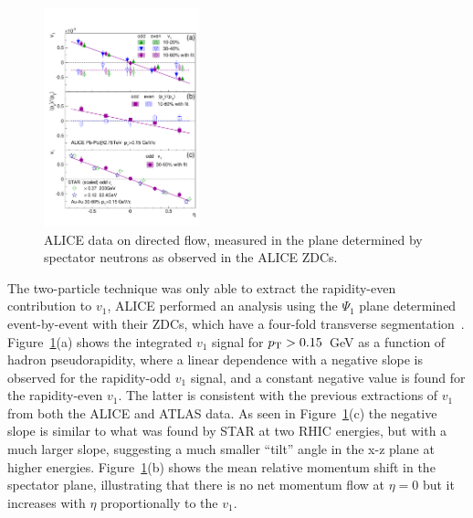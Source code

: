 \begin{figure}[!tb]
\begin{center}
\includegraphics[width=0.4\textwidth]{flowcorrelations_figs/paper_v1_midrapidity_spectators_Figure2.pdf}
\caption[]{ALICE data on directed flow, measured in the plane determined by spectator neutrons
as observed in the ALICE ZDCs.}
\label{fig:pas:fc:v1b}
\end{center}
\end{figure}

The two-particle technique was only able to extract the rapidity-even contribution to $v_1$,
ALICE performed an analysis using the $\Psi_1$ plane determined event-by-event with their
ZDCs, which have a four-fold transverse segmentation~\cite{Abelev:2013cva}.
Figure~\ref{fig:pas:fc:v1b}(a) shows the integrated $v_1$ signal for $\mbox{$p_{\mathrm{T}}$}>0.15$~GeV as a
function of hadron pseudorapidity, where a linear dependence with a negative slope is observed
for the rapidity-odd $v_1$ signal, and a constant negative value is found for the rapidity-even
$v_1$.  The latter is consistent with the previous extractions of $v_1$ from both the ALICE
and ATLAS data.
As seen in Figure~\ref{fig:pas:fc:v1b}(c) the negative slope is similar to what was found by STAR at
two RHIC energies, but with a much larger slope, suggesting a much smaller ``tilt'' angle
in the x-z plane at higher energies.
Figure~\ref{fig:pas:fc:v1b}(b) shows the mean relative momentum shift in the spectator plane, illustrating
that there is no net momentum flow at $\eta=0$ but it increases with $\eta$ proportionally
to the $v_1$.

